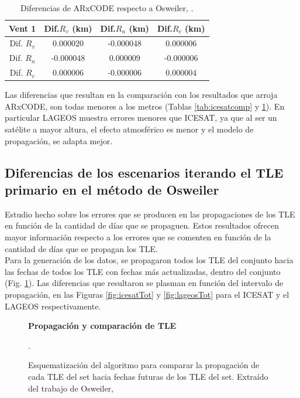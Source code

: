 \begin{table}
\caption{Diferencias de ARxCODE respecto a Osweiler, \citep{osweiler}.}
 \begin{tabular}{cccc}
  \hline
 Vent 1 & Dif.$R_{v}$ (km) & Dif.$R_{n}$ (km) & Dif.$R_{c}$ (km)\\
 \hline
 Dif. $R_{v}$ & 0.000020 &  -0.000048 &  0.000006 \\
 Dif. $R_{n}$ & -0.000048 &   0.000009 &  -0.000006 \\
 Dif. $R_{c}$ & 0.000006 &  -0.000006 &   0.000004 \\
 \hline
 \end{tabular}
 \label{tab:lageoscomp}
\end{table}

Las diferencias que resultan en la comparaci\'on con los resultados que arroja ARxCODE, son todas menores a los metros (Tablas \ref{tab:icesatcomp} y \ref{tab:lageoscomp}). En particular LAGEOS muestra errores menores que ICESAT, ya que al ser un sat\'elite a mayor altura, el efecto atmosf\'erico es menor y el modelo de propagaci\'on, se adapta mejor.\\

\subsection*{Diferencias de los escenarios iterando el TLE primario en el m\'etodo de Osweiler}
Estudio hecho sobre los errores que se producen en las propagaciones de los TLE en funci\'on de la cantidad de d\'ias que se propaguen.
Estos resultados ofrecen mayor informaci\'on respecto a los errores que se comenten en funci\'on de la cantidad de d\'ias que se propagan los TLE.\\

Para la generaci\'on de los datos, se propagaron todos los TLE del conjunto hacia las fechas de todos los TLE con fechas m\'as actualizadas, dentro del conjunto (Fig. \ref{fig:todosOSW}). Las diferencias que resultaron se plasman en funci\'on del intervalo de propagaci\'on, en las Figuras \ref{fig:icesatTot} y \ref{fig:lageosTot} para el ICESAT y el LAGEOS respectivamente. 


\begin{figure}[!h]
\centering
  \textbf{Propagaci\'on y comparaci\'on de TLE }\par\medskip
  \caption{Esquematizaci\'on del algoritmo para comparar la propagaci\'on de cada TLE del set hacia fechas futuras de los TLE del set. Extra\'ido del trabajo de Osweiler, \citep{osweiler}}.
  \label{fig:todosOSW}
\end{figure}

